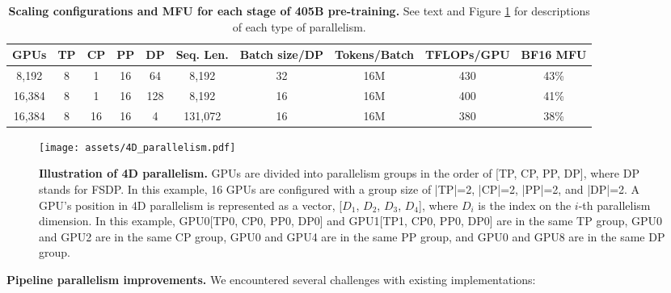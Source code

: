 \begin{table}
	\centering
	\begin{tabular}{cccccccc|cc}
	\toprule
	     \textbf{GPUs} & \textbf{TP} & \textbf{CP} & \textbf{PP} & \textbf{DP}   & \textbf{Seq. Len.} &   \textbf{Batch size/DP} & \textbf{Tokens/Batch} & \textbf{TFLOPs/GPU} & \textbf{BF16 MFU}\\ 
	\midrule
	8,192    & 8 & 1 & 16 & 64   & 8,192   &   32 & 16M  & 430      & 43\%        \\
	16,384   & 8 & 1 & 16 & 128   & 8,192   &   16 & 16M  & 400      & 41\%        \\
	16,384   & 8 & 16 & 16 & 4   & 131,072 &   16 & 16M   & 380     & 38\%        \\
	\bottomrule

	\end{tabular}
\caption{\textbf{Scaling configurations and MFU for each stage of \llamathree 405B pre-training.} See text and Figure \ref{fig:4d_parallelism} for descriptions of each type of parallelism.}
\label{table:mfu}
\end{table}

\begin{figure}[t]
     \centering
     \texttt{[image: assets/4D\_parallelism.pdf]}
     \caption{\textbf{Illustration of 4D parallelism.} GPUs are divided into parallelism groups in the order of [TP, CP, PP, DP], where DP stands for FSDP. In this example, 16 GPUs are configured with a group size of |TP|=2, |CP|=2, |PP|=2, and |DP|=2. 
     A GPU's position in 4D parallelism is represented as a vector, [$D_1$, $D_2$, $D_3$, $D_4$], where $D_i$ is the index on the $i$-th parallelism dimension. In this example,
     GPU0[TP0, CP0, PP0, DP0] and GPU1[TP1, CP0, PP0, DP0] are in the same TP group, GPU0 and GPU2 are in the same CP group, GPU0 and GPU4 are in the same PP group, and GPU0 and GPU8 are in the same DP group.
     }
     \label{fig:4d_parallelism}
\end{figure}

\textbf{Pipeline parallelism improvements.}
We encountered several challenges with existing implementations:

